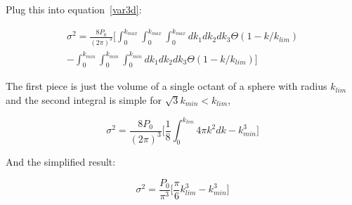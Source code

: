\documentclass[10pt]{article}
\begin{document}
Plug this into equation~\ref{var3d}:

\begin{multline}
\sigma^2 = \frac{8 P_0}{(2\pi)^3} \biggl[ \int_{0}^{k_{max}} \int_{0}^{k_{max}} \int_{0}^{k_{max}} dk_1 dk_2 dk_3 \Theta(1- k/k_{lim}) \\
 - \int_{0}^{k_{min}} \int_{0}^{k_{min}} \int_{0}^{k_{min}} dk_1 dk_2 dk_3 \Theta(1- k/k_{lim}) \biggr]
\end{multline}

The first piece is just the volume of a single octant of a sphere with radius $k_{lim}$ and the second integral is simple for $\sqrt{3} k_{min} < k_{lim}$,  

\begin{equation}
\sigma^2 = \frac{8 P_0}{(2\pi)^3} \biggl[ \frac{1}{8} \int_0^{k_{lim}} 4 \pi k^2 dk - k_{min}^3 \biggr]
\end{equation}

And the simplified result:

\begin{equation}
\sigma^2 = \frac{P_0}{\pi^3} \biggl[ \frac{\pi}{6} k_{lim}^3 - k_{min}^3 \biggr]
\end{equation}
\end{document}
